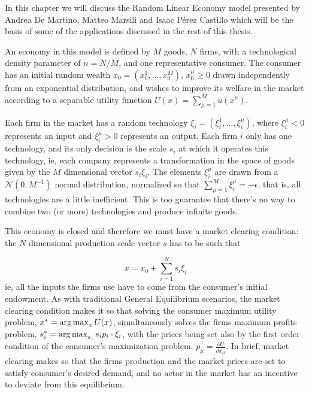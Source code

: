 In this chapter we will discuss the Random Linear Economy model
\cite{DeMartinoMarsili04} presented by Andrea De Martino, Matteo
Marsili and Isaac Pérez Castillo which will be the basis of some of
the applications discussed in the rest of this thesis.

An economy in this model is defined by $M$
goods, $N$ firms, with a technological density parameter of $n = N/M$,
and one representative consumer. The consumer has an initial random
wealth $x_0 = (x_0^1, \ldots, x_0^M)$, $x_0^\mu \geq 0$ drawn
independently from an exponential distribution, and wishes to improve
its welfare in the market according to a separable utility function
$U(x) = \sum_{\mu=1}^M u(x^\mu)$.

Each firm in the market has a random technology
$\xi_i = (\xi_i^1, \ldots, \xi_i^\mu)$, where $\xi_i^\mu<0$ represents
an input and $\xi_i^\mu>0$ represents an output.  Each firm $i$ only
has one technology, and its only decision is the scale $s_i$ at which
it operates this technology, ie, each company represents a
transformation in the space of goods given by the $M$ dimensional
vector $s_i \xi_i$. The elements $\xi_i^\mu$ are drawn from a
$\mathcal{N}(0, M^{-1})$ normal distribution, normalized so that
$\sum_{\mu=1}^M \xi_i^\mu = -\epsilon$, that is, all technologies are
a little inefficient. This is too guarantee that there's no way to
combine two (or more) technologies and produce infinite goods.

This economy is closed and therefore we must have a market clearing
condition: the $N$ dimensional production scale vector $s$ has to be
such that

\begin{equation}
x = x_0 + \sum_{i=1}^N s_i \xi_i
\label{eq:market_clearing}
\end{equation}
ie, all the inputs the firms use have to come from the consumer's
initial endowment. As with traditional General Equilibrium scenarios,
the market clearing condition makes it so that solving the consumer
maximum utility problem, $x^* = \operatorname*{arg\,max}_x U(x)$, simultaneously solves
the firms maximum profits problem,
$s_i^* = \operatorname*{arg\,max}_{s_i} s_i p_i \cdot \xi_i$, with the prices being set
also by the first order condition of the consumer's maximization
problem, $p_\mu = \frac{\partial U}{\partial x_\mu}$. In brief, market
clearing makes so that the firms production and the market prices are
set to satisfy consumer's desired demand, and no actor in the market
has an incentive to deviate from this equilibrium.


